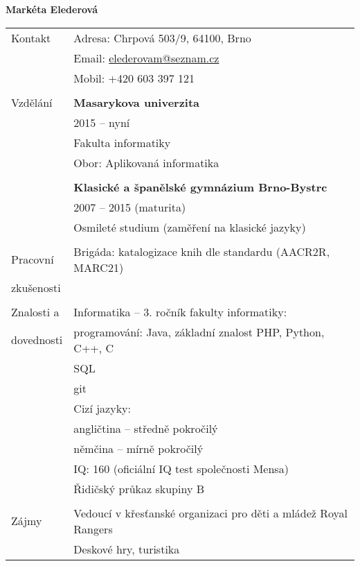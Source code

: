 \documentclass[letterpaper,12pt,oneside]{article}
\begin{document}
\noindent  \LARGE{\textbf{Markéta Elederová}}  \\
\vspace{-2ex}



\normalsize 


\vspace{1em}


\noindent \begin{tabular}{@{} l l}
 \Large{Kontakt}    & Adresa: Chrpová 503/9, 64100, Brno  \\
     & Email: \href{mailto:elederovam@seznam.cz}{elederovam@seznam.cz} \\
     & Mobil: +420 603 397 121 \\
     & \\

 \Large{Vzdělání}    & \textbf{Masarykova univerzita} \\
     & 2015 – nyní \\
     & Fakulta informatiky \\
     & Obor: Aplikovaná informatika \\
     & \\
     & \textbf{Klasické a španělské gymnázium Brno-Bystrc} \\
     & 2007 – 2015 (maturita) \\
     & Osmileté studium (zaměření na klasické jazyky) \\
     & \\

 \Large{Pracovní}    & Brigáda: katalogizace knih dle standardu (AACR2R, MARC21) \\
  \Large{zkušenosti}   & \\
    & \\
    
 \Large{Znalosti a }   &Informatika – 3. ročník fakulty informatiky: \\
  \Large{dovednosti}   & \qquad programování: Java, základní znalost PHP, Python, C++, C \\
     &                   \qquad SQL \\
     &                   \qquad git \\
     & Cizí jazyky: \\
     & \qquad angličtina – středně pokročilý \\
     & \qquad němčina – mírně pokročilý \\
     & IQ: 160 (oficiální IQ test společnosti Mensa) \\
     & Řidičský průkaz skupiny B \\
     & \\

  \Large{Zájmy}   & Vedoucí v křesťanské organizaci pro děti a mládež Royal Rangers \\
  & Deskové hry, turistika
\end{tabular}
\end{document}

